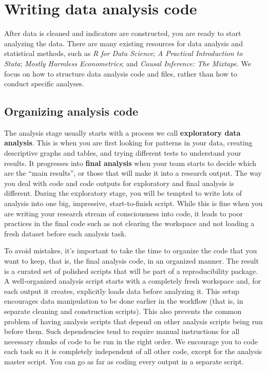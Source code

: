 
\section{Writing data analysis code}

After data is cleaned and indicators are constructed, you are ready to start analyzing the data.
There are many existing resources for data analysis and statistical methods, such as
\textit{R for Data Science};
\textit{A Practical Introduction to Stata};
\textit{Mostly Harmless Econometrics};
and \textit{Causal Inference: The Mixtape}.
We focus on how to structure data analysis code and files, rather than how to conduct specific analyses.

\subsection{Organizing analysis code}

The analysis stage usually starts with a process we call \textbf{exploratory data analysis}.
This is when you are first looking for patterns in your data,
creating descriptive graphs and tables,
and trying different tests to understand your results.
It progresses into \textbf{final analysis} when your team starts to decide which are the ``main results'', or
those that will make it into a research output.
The way you deal with code and code outputs for exploratory and final analysis is different.
During the exploratory stage,
you will be tempted to write lots of analysis into one big, impressive, start-to-finish script.
While this is fine when you are writing your research stream of consciousness into code,
it leads to poor practices in the final code such as not clearing the workspace
and not loading a fresh dataset before each analysis task.

To avoid mistakes, it's important to take the time
to organize the code that you want to keep, that is,
the final analysis code, in an organized manner.
The result is a curated set of polished scripts that
will be part of a reproducibility package.
A well-organized analysis script starts with a completely fresh workspace
and, for each output it creates, explicitly loads data before analyzing it.
This setup encourages data manipulation to be done earlier in the workflow
(that is, in separate cleaning and construction scripts).
This also prevents the common problem of having analysis scripts
that depend on other analysis scripts being run before them.
Such dependencies tend to require manual instructions
for all necessary chunks of code to be run in the right order.
We encourage you to code each task so
it is completely independent of all other code,
except for the analysis master script.
You can go as far as coding every output in a separate script.

